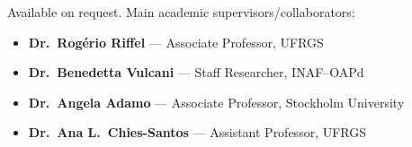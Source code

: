 
\begin{flushleft}
\small
\vspace{0.2em}
Available on request. Main academic supervisors/collaborators:

\begin{itemize}
  \item \textbf{Dr.\ Rogério Riffel} --- Associate Professor, UFRGS\\
  \vspace{0.2em}
  
  \item \textbf{Dr.\ Benedetta Vulcani} --- Staff Researcher, INAF--OAPd\\
  \vspace{0.2em}

  \item \textbf{Dr.\ Angela Adamo} --- Associate Professor, Stockholm University\\
  \vspace{0.2em}
    
  \item \textbf{Dr.\ Ana L.\ Chies-Santos} --- Assistant Professor, UFRGS\\
        
\end{itemize}
\end{flushleft}
